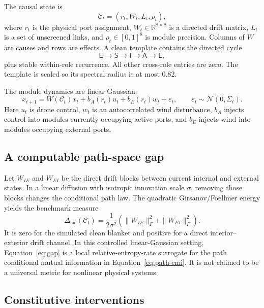 \documentclass[11pt,a4paper]{article}
\numberwithin{equation}{section}
\newcommand{\Irole}{\mathsf{I}}
\newcommand{\Srole}{\mathsf{S}}
\newcommand{\Arole}{\mathsf{A}}
\newcommand{\Erole}{\mathsf{E}}
\newcommand{\R}{\mathbb{R}}
\newcommand{\Corg}{\mathcal{C}}
\newcommand{\Gap}{\Delta_{\mathrm{fac}}}
\begin{document}
The causal state is
\begin{equation}
 \Corg_t=(r_t,W_t,L_t,\rho_t),
 \label{eq:causal-state}
\end{equation}
where $r_t$ is the physical port assignment, $W_t\in\R^{8\times8}$ is a
directed drift matrix, $L_t$ is a set of unscreened links, and
$\rho_t\in[0,1]^8$ is module precision. Columns of $W$ are causes and rows
are effects. A clean template contains the directed cycle
\begin{equation}
 \Erole\longrightarrow\Srole\longrightarrow\Irole
 \longrightarrow\Arole\longrightarrow\Erole,
 \label{eq:role-cycle}
\end{equation}
plus stable within-role recurrence. All other cross-role entries are zero.
The template is scaled so its spectral radius is at most $0.82$.

The module dynamics are linear Gaussian:
\begin{equation}
 x_{t+1}=W(\Corg_t)x_t+b_A(r_t)u_t+b_E(r_t)w_t+\varepsilon_t,
 \qquad \varepsilon_t\sim\mathcal N(0,\Sigma_t).
 \label{eq:dynamics}
\end{equation}
Here $u_t$ is drone control, $w_t$ is an autocorrelated wind disturbance,
$b_A$ injects control into modules currently occupying active ports, and
$b_E$ injects wind into modules occupying external ports.

\subsection{A computable path-space gap}

Let $W_{IE}$ and $W_{EI}$ be the direct drift blocks between current internal
and external states. In a linear diffusion with isotropic innovation scale
$\sigma$, removing those blocks changes the conditional path law. The
quadratic Girsanov/Foellmer energy yields the benchmark measure
\begin{equation}
 \Gap(\Corg_t)=\frac{1}{2\sigma^2}
 \left(\|W_{IE}\|_F^2+\|W_{EI}\|_F^2\right).
 \label{eq:gap}
\end{equation}
It is zero for the simulated clean blanket and positive for a direct
interior--exterior drift channel. In this controlled linear-Gaussian setting,
Equation~\eqref{eq:gap} is a local relative-entropy-rate surrogate for the
path conditional mutual information in Equation~\eqref{eq:path-cmi}. It is
not claimed to be a universal metric for nonlinear physical systems.

\subsection{Constitutive interventions}
\end{document}
